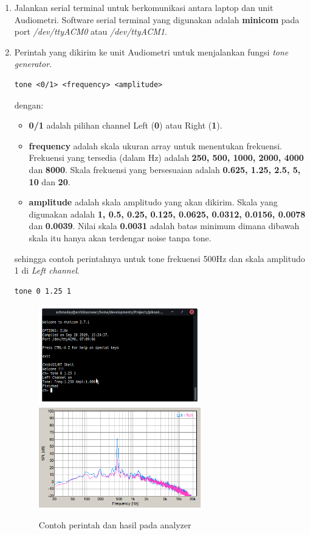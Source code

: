\documentclass[12pt,]{article}
\begin{document}
\begin{enumerate}
		\newpage
		\item Jalankan serial terminal untuk berkomunikasi antara laptop dan unit Audiometri.
		Software serial terminal yang digunakan adalah \textbf{minicom} pada port \textit{/dev/ttyACM0} atau \textit{/dev/ttyACM1}.
		
		\item Perintah yang dikirim ke unit Audiometri untuk menjalankan fungsi \textit{tone generator}.
\begin{verbatim}
tone <0/1> <frequency> <amplitude>
\end{verbatim}
		dengan:
		\begin{itemize}
			\item \textbf{0/1} adalah pilihan channel Left (\textbf{0}) atau Right (\textbf{1}).
			
			\item \textbf{frequency} adalah skala ukuran array untuk menentukan frekuensi.
			Frekuensi yang tersedia (dalam Hz) adalah \textbf{250, 500, 1000, 2000, 4000} dan \textbf{8000}.
			Skala frekuensi yang bersesuaian adalah \textbf{0.625, 1.25, 2.5, 5, 10} dan \textbf{20}.
			
			\item \textbf{amplitude} adalah skala amplitudo yang akan dikirim.
			Skala yang digunakan adalah \textbf{1, 0.5, 0.25, 0.125, 0.0625, 0.0312, 0.0156, 0.0078} dan \textbf{0.0039}.
			Nilai skala \textbf{0.0031} adalah batas minimum dimana dibawah skala itu hanya akan terdengar noise tanpa tone.
		\end{itemize}
		
		sehingga contoh perintahnya untuk tone frekuensi 500Hz dan skala amplitudo 1 di \textit{Left channel}.
\begin{verbatim}
tone 0 1.25 1
\end{verbatim}

		\begin{figure}[!ht]
			\centering
			\includegraphics[width=200pt]{hasil/test/cmdtest}
			\includegraphics[width=200pt]{hasil/test/test}
			\caption{Contoh perintah dan hasil pada analyzer}
		\end{figure}
	\end{enumerate}
\end{document}

